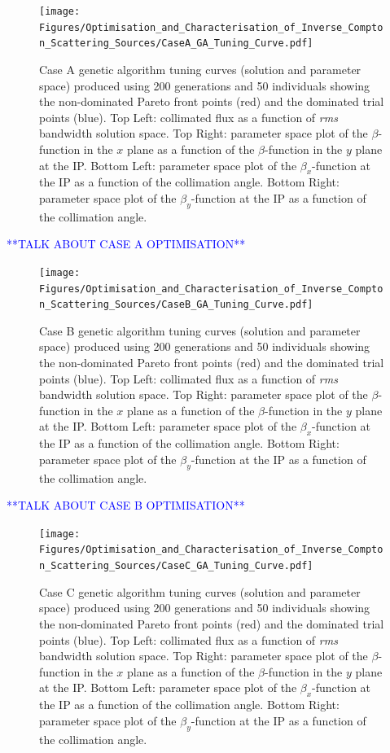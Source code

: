 \documentclass[../main.tex]{subfiles}
\begin{document}
\begin{figure}[!h]
\centering
\texttt{[image: Figures/Optimisation\_and\_Characterisation\_of\_Inverse\_Compton\_Scattering\_Sources/CaseA\_GA\_Tuning\_Curve.pdf]}
\caption{Case A genetic algorithm tuning curves (solution and parameter space) produced using 200 generations and 50 individuals showing the non-dominated Pareto front points (red) and the dominated trial points (blue). Top Left: collimated flux as a function of \textit{rms} bandwidth solution space. Top Right: parameter space plot of the $\beta$-function in the $x$ plane as a function of the $\beta$-function in the $y$ plane at the IP. Bottom Left: parameter space plot of the $\beta_{x}$-function at the IP as a function of the collimation angle. Bottom Right: parameter space plot of the $\beta_{y}$-function at the IP as a function of the collimation angle.}
\label{fig:case_A_GA_tuning_curves}
\end{figure}

\textcolor{blue}{**TALK ABOUT CASE A OPTIMISATION**}

\begin{figure}[!h]
\centering
\texttt{[image: Figures/Optimisation\_and\_Characterisation\_of\_Inverse\_Compton\_Scattering\_Sources/CaseB\_GA\_Tuning\_Curve.pdf]}
\caption{Case B genetic algorithm tuning curves (solution and parameter space) produced using 200 generations and 50 individuals showing the non-dominated Pareto front points (red) and the dominated trial points (blue). Top Left: collimated flux as a function of \textit{rms} bandwidth solution space. Top Right: parameter space plot of the $\beta$-function in the $x$ plane as a function of the $\beta$-function in the $y$ plane at the IP. Bottom Left: parameter space plot of the $\beta_{x}$-function at the IP as a function of the collimation angle. Bottom Right: parameter space plot of the $\beta_{y}$-function at the IP as a function of the collimation angle.}
\label{fig:case_B_GA_tuning_curves}
\end{figure}

\textcolor{blue}{**TALK ABOUT CASE B OPTIMISATION**}

\begin{figure}[!h]
\centering
\texttt{[image: Figures/Optimisation\_and\_Characterisation\_of\_Inverse\_Compton\_Scattering\_Sources/CaseC\_GA\_Tuning\_Curve.pdf]}
\caption{Case C genetic algorithm tuning curves (solution and parameter space) produced using 200 generations and 50 individuals showing the non-dominated Pareto front points (red) and the dominated trial points (blue). Top Left: collimated flux as a function of \textit{rms} bandwidth solution space. Top Right: parameter space plot of the $\beta$-function in the $x$ plane as a function of the $\beta$-function in the $y$ plane at the IP. Bottom Left: parameter space plot of the $\beta_{x}$-function at the IP as a function of the collimation angle. Bottom Right: parameter space plot of the $\beta_{y}$-function at the IP as a function of the collimation angle.}
\label{fig:case_C_GA_tuning_curves}
\end{figure}
\end{document}
